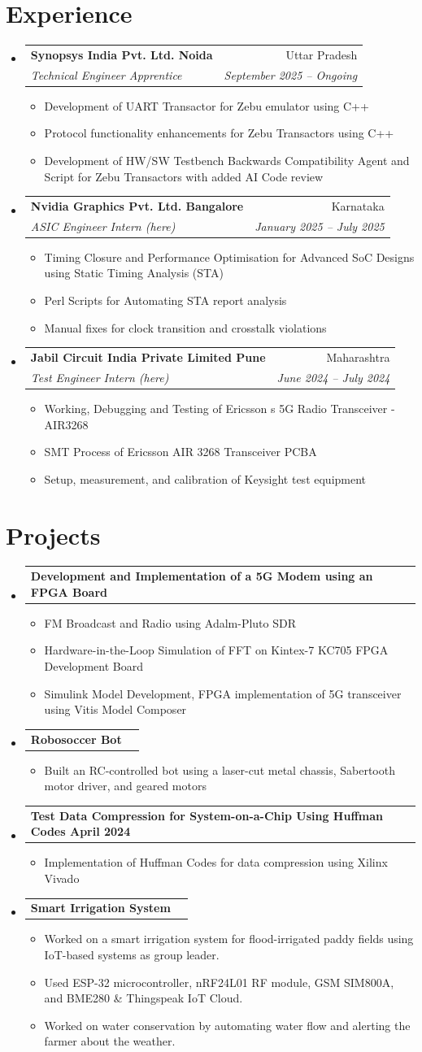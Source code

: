 \documentclass[letterpaper,11pt]{article}
\makeatletter
\newcommand{\resumeItem}[1]{\item\small{#1 \vspace{-2pt}}}
\newcommand{\resumeSubheading}[4]{
  \vspace{-2pt}\item
    \begin{tabular*}{\textwidth}[t]{l@{\extracolsep{\fill}}r}
      \textbf{#1} & #2 \\
      \textit{\small#3} & \textit{\small #4} \\
    \end{tabular*}\vspace{-7pt}
}
\newcommand{\resumeProjectHeading}[2]{
    \item
    \begin{tabular*}{\textwidth}{l@{\extracolsep{\fill}}r}
      \small#1 & #2 \\
    \end{tabular*}\vspace{-7pt}
}
\newcommand{\resumeSubHeadingListStart}{\begin{itemize}[leftmargin=0.15in, label={}]}
\newcommand{\resumeSubHeadingListEnd}{\end{itemize}}
\newcommand{\resumeItemListStart}{\begin{itemize}}
\newcommand{\resumeItemListEnd}{\end{itemize}\vspace{-5pt}}
\makeatother
\begin{document}
\section{Experience}
\resumeSubHeadingListStart
  \resumeSubheading
    { Synopsys India Pvt. Ltd. Noida }{ Uttar Pradesh }
    { Technical Engineer Apprentice }{ September 2025 -- Ongoing }
    \resumeItemListStart
      \resumeItem{ Development of UART Transactor for Zebu emulator using C++ }
      \resumeItem{ Protocol functionality enhancements for Zebu Transactors using C++ }
      \resumeItem{ Development of HW/SW Testbench Backwards Compatibility Agent and Script for Zebu Transactors with added AI Code review }
    \resumeItemListEnd
  \resumeSubheading
    { Nvidia Graphics Pvt. Ltd. Bangalore }{ Karnataka }
    { ASIC Engineer Intern (here) }{ January 2025 -- July 2025 }
    \resumeItemListStart
      \resumeItem{ Timing Closure and Performance Optimisation for Advanced SoC Designs using Static Timing Analysis (STA) }
      \resumeItem{ Perl Scripts for Automating STA report analysis }
      \resumeItem{ Manual fixes for clock transition and crosstalk violations }
    \resumeItemListEnd
  \resumeSubheading
    { Jabil Circuit India Private Limited Pune }{ Maharashtra }
    { Test Engineer Intern (here) }{ June 2024 -- July 2024 }
    \resumeItemListStart
      \resumeItem{ Working, Debugging and Testing of Ericsson s 5G Radio Transceiver - AIR3268 }
      \resumeItem{ SMT Process of Ericsson AIR 3268 Transceiver PCBA }
      \resumeItem{ Setup, measurement, and calibration of Keysight test equipment }
    \resumeItemListEnd
\resumeSubHeadingListEnd

\section{Projects}
\resumeSubHeadingListStart
  \resumeProjectHeading
    {\textbf{ Development and Implementation of a 5G Modem using an FPGA Board }}{  }
    \resumeItemListStart
      \resumeItem{ FM Broadcast and Radio using Adalm-Pluto SDR }
      \resumeItem{ Hardware-in-the-Loop Simulation of FFT on Kintex-7 KC705 FPGA Development Board }
      \resumeItem{ Simulink Model Development, FPGA implementation of 5G transceiver using Vitis Model Composer }
    \resumeItemListEnd
  \resumeProjectHeading
    {\textbf{ Robosoccer Bot }}{  }
    \resumeItemListStart
      \resumeItem{ Built an RC-controlled bot using a laser-cut metal chassis, Sabertooth motor driver, and geared motors }
    \resumeItemListEnd
  \resumeProjectHeading
    {\textbf{ Test Data Compression for System-on-a-Chip Using Huffman Codes April 2024 }}{  }
    \resumeItemListStart
      \resumeItem{ Implementation of Huffman Codes for data compression using Xilinx Vivado }
    \resumeItemListEnd
  \resumeProjectHeading
    {\textbf{ Smart Irrigation System }}{  }
    \resumeItemListStart
      \resumeItem{ Worked on a smart irrigation system for flood-irrigated paddy fields using IoT-based systems as group leader. }
      \resumeItem{ Used ESP-32 microcontroller, nRF24L01 RF module, GSM SIM800A, and BME280 \& Thingspeak IoT Cloud. }
      \resumeItem{ Worked on water conservation by automating water flow and alerting the farmer about the weather. }
    \resumeItemListEnd
\resumeSubHeadingListEnd
\end{document}
